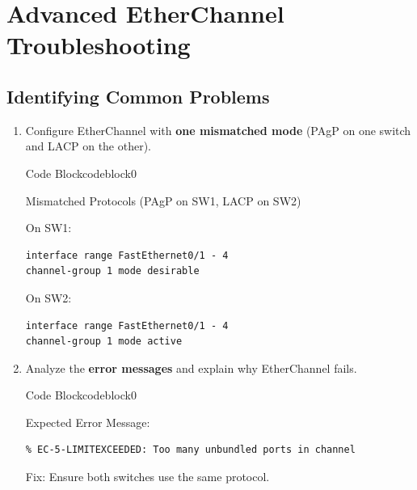 \documentclass[a4paper]{article}
\begin{document}
\section{Advanced EtherChannel Troubleshooting}
\subsection{Identifying Common Problems}
\begin{enumerate}
	\item Configure EtherChannel with \textbf{one mismatched mode} (PAgP on one switch and LACP on the other).



	      \begin{ocg}{Code Block}{codeblock}{0}

		      \vspace{0.5cm}

		      Mismatched Protocols (PAgP on SW1, LACP on SW2)

		      On SW1:
		      \begin{lstlisting}
interface range FastEthernet0/1 - 4
channel-group 1 mode desirable
\end{lstlisting}

		      On SW2:
		      \begin{lstlisting}
interface range FastEthernet0/1 - 4
channel-group 1 mode active
\end{lstlisting}
		      \vspace{0.5cm}
	      \end{ocg}
	\item Analyze the \textbf{error messages} and explain why EtherChannel fails.


	      \begin{ocg}{Code Block}{codeblock}{0}

		      \vspace{0.5cm}

		      Expected Error Message:
		      \begin{lstlisting}
% EC-5-LIMITEXCEEDED: Too many unbundled ports in channel
\end{lstlisting}
		      \begin{tcolorbox}
			      Fix: Ensure both switches use the same protocol.
		      \end{tcolorbox}



\end{ocg}
\end{enumerate}
\end{document}

